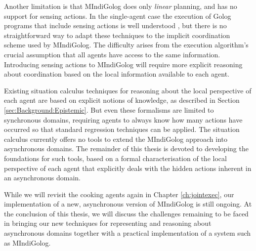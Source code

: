 Another limitation is that MIndiGolog does only \emph{linear} planning,
and has no support for sensing actions. In the single-agent case the
execution of Golog programs that include sensing actions is well understood
\citep{giacomo99indigolog,lakemeyer99golog_cats}, but there is no
straightforward way to adapt these techniques to the implicit coordination
scheme used by MIndiGolog. The difficulty arises from the execution
algorithm's crucial assumption that all agents have access to the
same information. Introducing sensing actions to MIndiGolog will require
more explicit reasoning about coordination based on the local information
available to each agent.

Existing situation calculus techniques for reasoning about the local
perspective of each agent are based on explicit notions of knowledge,
as described in Section \ref{sec:Background:Epistemic}. But even
these formalisms are limited to synchronous domains, requiring agents
to always know how many actions have occurred so that standard regression
techniques can be applied. The situation calculus currently offers
no tools to extend the MIndiGolog approach into asynchronous domains.
The remainder of this thesis is devoted to developing the foundations
for such tools, based on a formal characterisation of the local perspective
of each agent that explicitly deals with the hidden actions inherent
in an asynchronous domain.

While we will revisit the cooking agents again in Chapter \ref{ch:jointexec},
our implementation of a new, asynchronous version of MIndiGolog is
still ongoing. At the conclusion of this thesis, we will discuss the
challenges remaining to be faced in bringing our new techniques for
representing and reasoning about asynchronous domains together with
a practical implementation of a system such as MIndiGolog.

